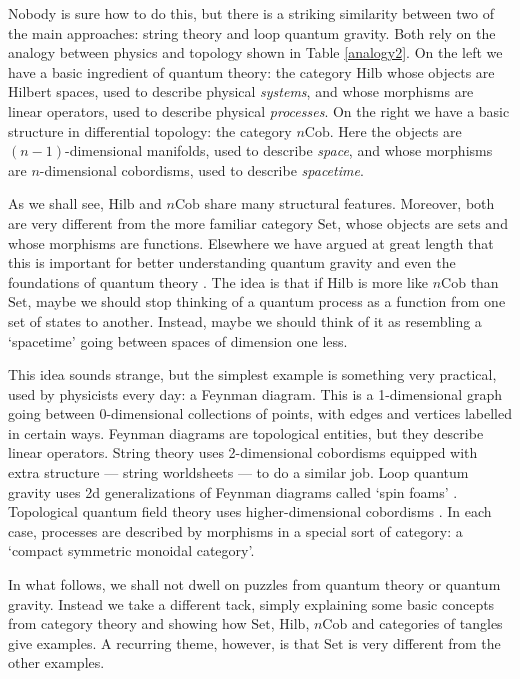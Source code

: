 \documentclass[12pt,twoside,openright]{report}
\newcommand{\Cob}{\mathrm{Cob}}
\newcommand{\Hilb}{\mathrm{Hilb}}
\newcommand{\Set}{\mathrm{Set}}
\begin{document}
Nobody is sure how to do this, but there is a striking similarity between two of the main approaches: string theory and loop quantum gravity.  Both rely on the analogy between physics and topology shown in Table \ref{analogy2}. On the left we have a basic ingredient of quantum theory: 
the category $\Hilb$ whose objects are Hilbert spaces, used to describe physical {\em systems}, and whose morphisms are linear operators, used to describe physical {\em processes}.  On the right we have a basic structure in differential topology: the category $n\Cob$. Here the objects are $(n-1)$-dimensional manifolds, used to describe
{\em space}, and whose morphisms are $n$-dimensional cobordisms, used to describe {\em spacetime}.  

As we shall see, $\Hilb$ and $n\Cob$ share many structural features. Moreover, both are very different from the more familiar category $\Set$, whose objects are sets and whose morphisms are functions. Elsewhere we have argued at great length that this is important for better understanding quantum gravity \cite{B3} and even the foundations of quantum theory \cite{B4}.  The idea is that if $\Hilb$ is more like 
$n\Cob$ than $\Set$, maybe we should stop thinking of a quantum process as a function from one set of states to another.  Instead, maybe we should think of it as resembling a `spacetime' going between spaces of dimension one less.   

This idea sounds strange, but the simplest example is something very practical, used by physicists every day: a Feynman diagram.  This is a 1-dimensional graph going between 0-dimensional collections of points, with edges and vertices labelled in certain ways.  Feynman diagrams are topological entities, but they describe linear operators. String theory uses 2-dimensional cobordisms equipped with extra structure --- string worldsheets --- to do a similar job.  Loop quantum gravity uses 2d generalizations of Feynman diagrams called `spin foams' \cite{B2}.  Topological quantum field theory uses higher-dimensional cobordisms \cite{HDATQFT}.  In each case, processes are described by morphisms in a special sort of category: a `compact symmetric monoidal category'.

In what follows, we shall not dwell on puzzles from quantum theory or quantum gravity.  Instead we take a different tack, simply explaining some basic concepts from category theory and showing how $\Set$, 
$\Hilb$, $n\Cob$ and categories of tangles give examples.  A recurring theme, however, is that $\Set$ is very different from the other examples.
\end{document}
